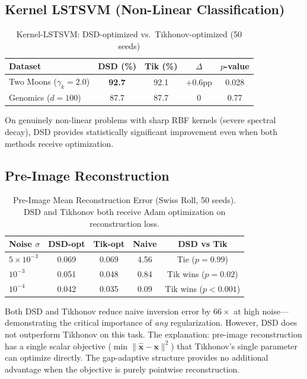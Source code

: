 \documentclass[journal]{IEEEtran}
\begin{document}
\subsection{Kernel LSTSVM (Non-Linear Classification)}

\begin{table}[!t]
\centering
\caption{Kernel-LSTSVM: DSD-optimized vs.\ Tikhonov-optimized (50 seeds)}
\label{tab:kernel_lstsvm_results}
\begin{tabular}{@{}lcccc@{}}
\toprule
\textbf{Dataset} & \textbf{DSD (\%)} & \textbf{Tik (\%)} & \textbf{$\Delta$} & \textbf{$p$-value} \\
\midrule
Two Moons ($\gamma_k{=}2.0$) & \textbf{92.7} & 92.1 & +0.6pp & 0.028 \\
Genomics ($d{=}100$) & 87.7 & 87.7 & 0 & 0.77 \\
\bottomrule
\end{tabular}
\end{table}

On genuinely non-linear problems with sharp RBF kernels (severe spectral decay), DSD provides statistically significant improvement even when both methods receive optimization.

\subsection{Pre-Image Reconstruction}

\begin{table}[!t]
\centering
\caption{Pre-Image Mean Reconstruction Error (Swiss Roll, 50 seeds). DSD and Tikhonov both receive Adam optimization on reconstruction loss.}
\label{tab:preimage_results}
\begin{tabular}{@{}lcccc@{}}
\toprule
\textbf{Noise $\sigma$} & \textbf{DSD-opt} & \textbf{Tik-opt} & \textbf{Naive} & \textbf{DSD vs Tik} \\
\midrule
$5{\times}10^{-3}$ & 0.069 & 0.069 & 4.56 & Tie ($p{=}0.99$) \\
$10^{-3}$ & 0.051 & 0.048 & 0.84 & Tik wins ($p{=}0.02$) \\
$10^{-4}$ & 0.042 & 0.035 & 0.09 & Tik wins ($p{<}0.001$) \\
\bottomrule
\end{tabular}
\end{table}

Both DSD and Tikhonov reduce naive inversion error by $66\times$ at high noise---demonstrating the critical importance of \emph{any} regularization. However, DSD does not outperform Tikhonov on this task. The explanation: pre-image reconstruction has a single scalar objective ($\min\|\hat{\bm{x}} - \bm{x}\|^2$) that Tikhonov's single parameter can optimize directly. The gap-adaptive structure provides no additional advantage when the objective is purely pointwise reconstruction.
\end{document}
